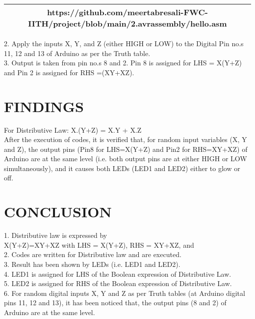 \documentclass[conference]{IEEEtran}
\begin{document}
\begin{table}[h]
\centering
\begin{tabular}{| c |} \hline
 \rule{0pt}{20pt} https://github.com/meertabresali-FWC-IITH/project/blob/main/2.avrassembly/hello.asm\\
  \hline
\end{tabular}
\end{table}
\begin{flushleft}
2. Apply the inputs X, Y, and Z (either HIGH or LOW) to the Digital Pin no.s 11, 12 and 13 of Arduino as per the Truth table.\\
\vspace{0.4cm}
3. Output is taken from pin no.s 8 and 2. Pin 8 is assigned for LHS = X(Y+Z) and Pin 2 is assigned for RHS =(XY+XZ). 
\end{flushleft}

\section{FINDINGS}
\begin{flushleft}
For Distributive Law: X.(Y+Z) = X.Y + X.Z \\
\vspace{0.3cm}
After the execution of codes, it is verified that, for random input variables (X, Y and Z), the output pins (Pin8 for LHS=X(Y+Z) and Pin2 for RHS=XY+XZ) of Arduino are at the same level (i.e. both output pins are at either HIGH or LOW simultaneously), and it causes both LEDs (LED1 and LED2) either to glow or off.\\

\end{flushleft}
\section{CONCLUSION}
\begin{flushleft}
1. Distributive law is expressed by \\
X(Y+Z)=XY+XZ with LHS = X(Y+Z), RHS = XY+XZ, and \\
2. Codes are written for Distributive law and are executed.\\
3. Result has been shown by LEDs (i.e. LED1 and LED2). \\
4. LED1 is assigned for LHS of the Boolean expression of Distributive Law. \\
5. LED2 is assigned for RHS of the Boolean expression of Distributive Law. \\
6. For random digital inputs X, Y and Z as per Truth tables (at Arduino digital pins 11, 12 and 13), it has been noticed that, the output pins (8 and 2) of Arduino are at the same level.
\end{flushleft}
\end{document}
